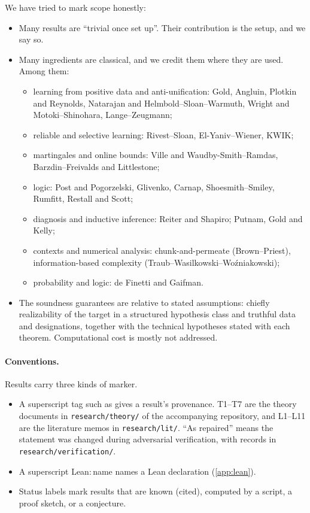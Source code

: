 We have tried to mark scope honestly:
\begin{itemize}
\item Many results are ``trivial once set up''. Their contribution is the setup, and we say so.
\item Many ingredients are classical, and we credit them where they are used. Among them:
  \begin{itemize}
  \item learning from positive data and anti-unification: Gold, Angluin, Plotkin and Reynolds, Natarajan and Helmbold--Sloan--Warmuth, Wright and Motoki--Shinohara, Lange--Zeugmann;
  \item reliable and selective learning: Rivest--Sloan, El-Yaniv--Wiener, KWIK;
  \item martingales and online bounds: Ville and Waudby-Smith--Ramdas, Barzdin--Freivalds and Littlestone;
  \item logic: Post and Pogorzelski, Glivenko, Carnap, Shoesmith--Smiley, Rumfitt, Restall and Scott;
  \item diagnosis and inductive inference: Reiter and Shapiro; Putnam, Gold and Kelly;
  \item contexts and numerical analysis: chunk-and-permeate (Brown--Priest), information-based complexity (Traub--Wasilkowski--Wo\'zniakowski);
  \item probability and logic: de Finetti and Gaifman.
  \end{itemize}
\item The soundness guarantees are relative to stated assumptions: chiefly realizability of the target in a structured hypothesis class and truthful data and designations, together with the technical hypotheses stated with each theorem. Computational cost is mostly not addressed.
\end{itemize}

\paragraph{Conventions.} Results carry three kinds of marker.
\begin{itemize}
\item A superscript tag such as  gives a result's provenance. T1--T7 are the theory documents in \texttt{research/theory/} of the accompanying repository, and L1--L11 are the literature memos in \texttt{research/lit/}. ``As repaired'' means the statement was changed during adversarial verification, with records in \texttt{research/verification/}.
\item A superscript \textsf{Lean:\,name} names a Lean declaration (\cref{app:lean}).
\item Status labels mark results that are known (cited), computed by a script, a proof sketch, or a conjecture.
\end{itemize}

